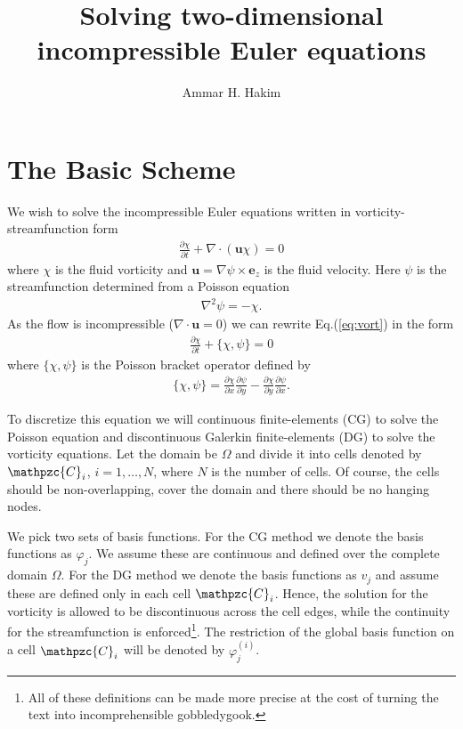 \documentclass[11pt, reqno]{amsart}
\title[Incompressible Flow]{Solving two-dimensional incompressible
  Euler equations}%
\author{Ammar H. Hakim}%
\date{}
\newcommand{\eqr}[1]{Eq.\thinspace(#1)}
\newcommand{\pfrac}[2]{\frac{\partial #1}{\partial #2}}
\newcommand{\mvec}[1]{\mathbf{#1}}
\newcommand{\script}[1]{\mathpzc{#1}}
\newcommand{\eez}{\mvec{e}_z}
\theoremstyle{definition}
\begin{document}
\maketitle

\section{The Basic Scheme}

We wish to solve the incompressible Euler equations written in
vorticity-streamfunction form
\begin{align}
  \pfrac{\chi}{t} + \nabla\cdot(\mvec{u}\chi) = 0 \label{eq:vort}
\end{align}
where $\chi$ is the fluid vorticity and $\mvec{u} =
\nabla\psi\times\eez$ is the fluid velocity. Here $\psi$ is the
streamfunction determined from a Poisson equation
\begin{align}
  \nabla^2 \psi = -\chi. \label{eq:stream}
\end{align}
As the flow is incompressible ($\nabla\cdot\mvec{u}=0$) we can rewrite
\eqr{\ref{eq:vort}} in the form
\begin{align}
  \pfrac{\chi}{t} + \{\chi,\psi\} = 0 \label{eq:vortPoisson}
\end{align}
where $\{\chi,\psi\}$ is the Poisson bracket operator defined by
\begin{align}
 \{\chi,\psi\} = \pfrac{\chi}{x}\pfrac{\psi}{y} - \pfrac{\chi}{y}\pfrac{\psi}{x}.
\end{align}

To discretize this equation we will continuous finite-elements (CG) to
solve the Poisson equation and discontinuous Galerkin finite-elements
(DG) to solve the vorticity equations. Let the domain be $\Omega$ and
divide it into cells denoted by $\script{C}_i$, $i=1,\ldots,N$, where
$N$ is the number of cells. Of course, the cells should be
non-overlapping, cover the domain and there should be no hanging
nodes.

We pick two sets of basis functions. For the CG method we denote the
basis functions as $\varphi_j$. We assume these are continuous and
defined over the complete domain $\Omega$. For the DG method we denote
the basis functions as $v_j$ and assume these are defined only in each
cell $\script{C}_i$. Hence, the solution for the vorticity is allowed
to be discontinuous across the cell edges, while the continuity for the
streamfunction is enforced\footnote{All of these definitions can be
  made more precise at the cost of turning the text into
  incomprehensible gobbledygook.}. The restriction of the global basis
function on a cell $\script{C}_i$ will be denoted by
$\varphi_j^{(i)}$.
\end{document}
